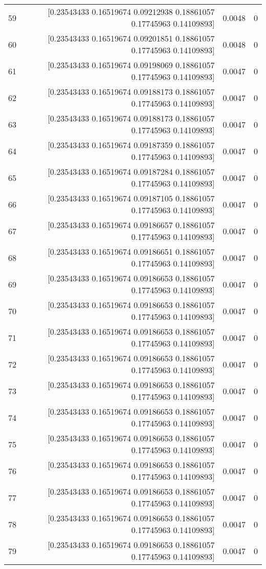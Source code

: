 \begin{longtable}{lrrr}
59 & [0.23543433 0.16519674 0.09212938 0.18861057 0.17745963 0.14109893] & 0.0048 & 0 \\
60 & [0.23543433 0.16519674 0.09201851 0.18861057 0.17745963 0.14109893] & 0.0048 & 0 \\
61 & [0.23543433 0.16519674 0.09198069 0.18861057 0.17745963 0.14109893] & 0.0047 & 0 \\
62 & [0.23543433 0.16519674 0.09188173 0.18861057 0.17745963 0.14109893] & 0.0047 & 0 \\
63 & [0.23543433 0.16519674 0.09188173 0.18861057 0.17745963 0.14109893] & 0.0047 & 0 \\
64 & [0.23543433 0.16519674 0.09187359 0.18861057 0.17745963 0.14109893] & 0.0047 & 0 \\
65 & [0.23543433 0.16519674 0.09187284 0.18861057 0.17745963 0.14109893] & 0.0047 & 0 \\
66 & [0.23543433 0.16519674 0.09187105 0.18861057 0.17745963 0.14109893] & 0.0047 & 0 \\
67 & [0.23543433 0.16519674 0.09186657 0.18861057 0.17745963 0.14109893] & 0.0047 & 0 \\
68 & [0.23543433 0.16519674 0.09186651 0.18861057 0.17745963 0.14109893] & 0.0047 & 0 \\
69 & [0.23543433 0.16519674 0.09186653 0.18861057 0.17745963 0.14109893] & 0.0047 & 0 \\
70 & [0.23543433 0.16519674 0.09186653 0.18861057 0.17745963 0.14109893] & 0.0047 & 0 \\
71 & [0.23543433 0.16519674 0.09186653 0.18861057 0.17745963 0.14109893] & 0.0047 & 0 \\
72 & [0.23543433 0.16519674 0.09186653 0.18861057 0.17745963 0.14109893] & 0.0047 & 0 \\
73 & [0.23543433 0.16519674 0.09186653 0.18861057 0.17745963 0.14109893] & 0.0047 & 0 \\
74 & [0.23543433 0.16519674 0.09186653 0.18861057 0.17745963 0.14109893] & 0.0047 & 0 \\
75 & [0.23543433 0.16519674 0.09186653 0.18861057 0.17745963 0.14109893] & 0.0047 & 0 \\
76 & [0.23543433 0.16519674 0.09186653 0.18861057 0.17745963 0.14109893] & 0.0047 & 0 \\
77 & [0.23543433 0.16519674 0.09186653 0.18861057 0.17745963 0.14109893] & 0.0047 & 0 \\
78 & [0.23543433 0.16519674 0.09186653 0.18861057 0.17745963 0.14109893] & 0.0047 & 0 \\
79 & [0.23543433 0.16519674 0.09186653 0.18861057 0.17745963 0.14109893] & 0.0047 & 0 \\

\end{longtable}
